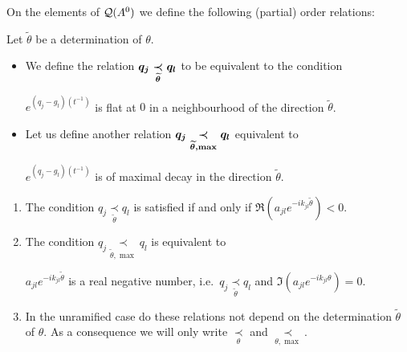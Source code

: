 On the elements of $\cQ(A^0)$ we define the following (partial) order
relations:
\begin{defn}
  Let $\tilde\theta$ be a determination of $\theta$.
  \begin{itemize}
    \item We define the relation
      $\boldmath q_j \underset{\tilde\theta}{\prec} q_l$ to be equivalent to
      the condition
      \begin{einr}
        $e^{(q_j-g_l)(t^{-1})}$ is flat at $0$ in a neighbourhood of the
        direction $\tilde\theta$.
      \end{einr}
    \item Let us define another relation
      $\boldmath q_j \underset{\tilde\theta,\max}{\prec} q_l$ equivalent to
      \begin{einr}
        $e^{(q_j-g_l)(t^{-1})}$ is of maximal decay in the direction
        $\tilde\theta$.
      \end{einr}
  \end{itemize}
  \begin{s-rem}
    \begin{enumerate}
      \item The condition $q_j \underset{\tilde\theta}{\prec} q_l$ is
        satisfied if and only if $\Re(a_{jl}e^{-ik_{jl}\tilde\theta})<0$.
      \item The condition $q_j \underset{\tilde\theta,\max}{\prec} q_l$ is
        equivalent to
        \begin{einr}
          $a_{jl}e^{-ik_{jl}\tilde\theta}$ is a real negative
          number, i.e.\ $q_j \underset{\tilde\theta}{\prec} q_l$ and
          $\Im(a_{jl}e^{-ik_{jl}\theta})=0$.
        \end{einr}
      \item In the unramified case do these relations not depend on the
        determination $\tilde\theta$ of $\theta$. As a consequence we will only
        write $\underset{\theta}{\prec}$ and $\underset{\theta,\max}{\prec}$.
    \end{enumerate}
  \end{s-rem}
\end{defn}
\iffalse
